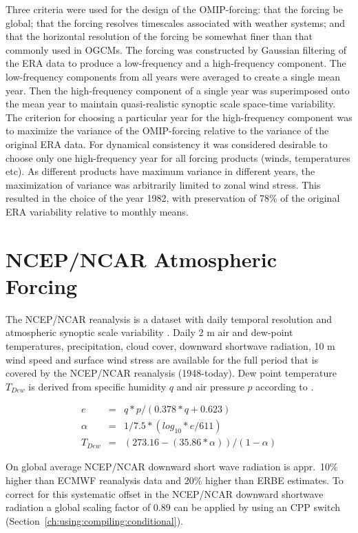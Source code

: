 Three criteria were used for the design of the OMIP-forcing:
that the forcing be global;
that the forcing resolves timescales associated with weather systems;
and that the horizontal resolution of the forcing be somewhat finer than that
commonly used in OGCMs.
The forcing was constructed by Gaussian filtering of the ERA data
to produce a low-frequency and a high-frequency component.
The low-frequency components from all years were averaged to create a single mean year.
Then the high-frequency component of a single year 
was superimposed onto the mean year to maintain
quasi-realistic synoptic scale space-time variability.
The criterion for choosing a particular year for the high-frequency component
was to maximize the variance of the OMIP-forcing relative to the
variance of the original ERA data.
For dynamical consistency it was considered desirable to choose
only one high-frequency year for all forcing products (winds, temperatures etc).
As different products have maximum variance in different years,
the maximization of variance was arbitrarily limited to zonal wind stress.
This resulted in the choice of the year 1982,
with preservation of 78\% of the original ERA
variability relative to monthly means.


\section{NCEP/NCAR Atmospheric Forcing}
\label{sec:numeric:ncep}
The NCEP/NCAR reanalysis is a dataset with daily
temporal resolution and atmospheric synoptic scale variability
\citep{kalnay96}. Daily 2 m air and dew-point temperatures,
precipitation, cloud cover, downward shortwave radiation, 10 m wind
speed and surface wind stress are available for the full period
that is covered by the NCEP/NCAR reanalysis (1948-today). Dew point
temperature $T_{Dew}$ is derived from specific humidity $q$ and air
pressure $p$ according to \cite{oberhuber88}.

\begin{eqnarray}
\label{tdew}
e & = & q * p / (0.378 * q + 0.623)\\
\alpha & = & 1 / 7.5 * (log_{10} * e/611)\\
T_{Dew} & = & (273.16 - (35.86 * \alpha ))/(1-\alpha)
\end{eqnarray}

On global average NCEP/NCAR downward short wave radiation is
appr.~10\% higher than ECMWF reanalysis data and 20\% higher
than ERBE estimates. To correct for this systematic offset in the
NCEP/NCAR downward shortwave radiation a global scaling factor of 0.89
can be applied by using an CPP switch (Section~\ref{ch:using:compiling:conditional}). 


